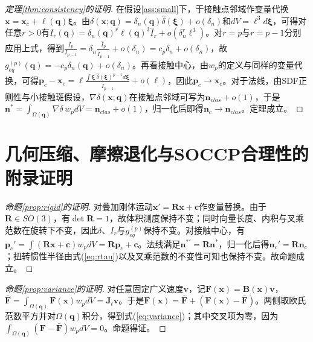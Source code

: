 ﻿\documentclass[12pt, a4paper]{ctexart}
\theoremstyle{plain}
\theoremstyle{remark}
\begin{document}
\begin{proof}[定理\ref{thm:consistency}的证明]
在假设\ref{ass:small}下，于接触点邻域作变量代换$ \bm{x} = \bm{x}_c + \ell(\bm{q}) \bm{\xi} $。由$\delta(\bm{x};\bm{q}) = \delta_n(\bm{q}) \hat{\delta}(\bm{\xi}) + o(\delta_n)$和$dV = \ell^3 d\bm{\xi}$，可得对任意$r > 0$有$ I_r(\bm{q}) = \delta_n(\bm{q})^r \ell(\bm{q})^3 \hat{I}_r + o\!\left( \delta_n^r \ell^3 \right) $。对$r = p$与$r = p-1$分别应用上式，得到$ \frac{I_p}{I_{p-1}} = \delta_n \frac{\hat{I}_p}{\hat{I}_{p-1}} + o(\delta_n) = c_p \delta_n + o(\delta_n) $，故$ g_{eq}^{(p)}(\bm{q}) = -c_p \delta_n(\bm{q}) + o(\delta_n) $。再看接触中心，由$w_p$的定义与同样的变量代换，可得$ \bm{p}_c - \bm{x}_c = \ell \frac{\int \bm{\xi} \, \hat{\delta}(\bm{\xi})^{p-1} d\bm{\xi}}{\hat{I}_{p-1}} + o(\ell) $，因此$\bm{p}_c \to \bm{x}_c$。对于法线，由SDF正则性与小接触斑假设，$\nabla \delta(\bm{x};\bm{q})$在接触点邻域可写为$\bm{n}_{clas} + o(1)$，于是$ \bm{n}^* = \int_{\Omega(\bm{q})} \nabla \delta \, w_p dV = \bm{n}_{clas} + o(1) $，归一化后即得$\bm{n}_c \to \bm{n}_{clas}$。定理成立。
\end{proof}

\section{几何压缩、摩擦退化与SOCCP合理性的附录证明}

\begin{proof}[命题\ref{prop:rigid}的证明]
对叠加刚体运动$\bm{x}' = \bm{R}\bm{x} + \bm{c}$作变量替换。由于$\bm{R} \in SO(3)$，有$\det \bm{R} = 1$，故体积测度保持不变；同时向量长度、内积与叉乘范数在旋转下不变，因此$\delta$、$I_r$与$g_{eq}^{(p)}$保持不变。对接触中心，有$ \bm{p}_c' = \int (\bm{R}\bm{x} + \bm{c}) w_p dV = \bm{R}\bm{p}_c + \bm{c} $。法线满足$\bm{n}^{*\prime} = \bm{R}\bm{n}^*$，归一化后得$\bm{n}_c' = \bm{R}\bm{n}_c$；扭转惯性半径由式(\ref{eq:rtau})以及叉乘范数的不变性可知也保持不变。故命题成立。
\end{proof}

\begin{proof}[命题\ref{prop:variance}的证明]
对任意固定广义速度$\bm{v}$，记$ \bm{F}(\bm{x}) = \bm{B}(\bm{x}) \bm{v} $，$ \bar{\bm{F}} = \int_{\Omega(\bm{q})} \bm{F}(\bm{x}) w_p dV = \bm{J}_t \bm{v} $。于是$\bm{F}(\bm{x}) = \bar{\bm{F}} + (\bm{F}(\bm{x}) - \bar{\bm{F}})$。两侧取欧氏范数平方并对$\Omega(\bm{q})$积分，得到式(\ref{eq:variance})；其中交叉项为零，因为$\int_{\Omega(\bm{q})} (\bm{F} - \bar{\bm{F}}) w_p dV = 0$。命题得证。
\end{proof}
\end{document}
